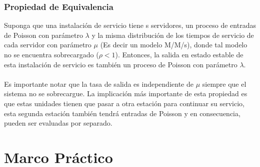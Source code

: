 \documentclass{article}
\begin{document}
\subsubsection{Propiedad de Equivalencia}
Suponga que una instalación de servicio tiene s servidores, un proceso de entradas
de Poisson con parámetro $\lambda$ y la misma distribución de los tiempos 
de servicio de cada servidor con parámetro $\mu$ (Es decir un modelo M/M/s), donde 
tal modelo no se encuentra sobrecargado ($\rho < 1$). Entonces, la salida en 
estado estable de esta instalación de servicio es también un proceso de Poisson
con parámetro $\lambda$.\\\\
Es importante notar que la tasa de salida es independiente de $\mu$ siempre
que el sistema no se sobrecargue. La implicación más importante de esta propiedad 
es que estas unidades tienen que pasar a otra estación para continuar su servicio, 
esta segunda estación también tendrá entradas de Poisson y en consecuencia, pueden 
ser evaluadas por separado. 

\section{Marco Práctico}
\end{document}
